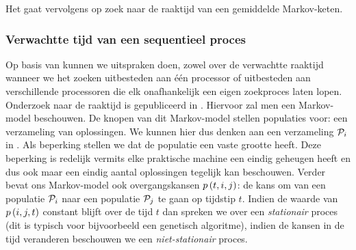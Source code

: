 Het  gaat vervolgens op zoek naar de raaktijd van een gemiddelde Markov-keten.

\subsubsection{Verwachtte tijd van een sequentieel proces}

Op basis van  kunnen we uitspraken doen, zowel over de verwachtte raaktijd wanneer we het zoeken uitbesteden aan \'e\'en processor of uitbesteden aan verschillende processoren die elk onafhankelijk een eigen zoekproces laten lopen. Onderzoek naar de raaktijd is gepubliceerd in \cite{DBLP:journals/jc/ShonkwilerV94}. Hiervoor zal men een Markov-model beschouwen. De knopen van dit Markov-model stellen populaties voor: een verzameling van oplossingen. We kunnen hier dus denken aan een verzameling $\mathcal{P}_i$ in . Als beperking stellen we dat de populatie een vaste grootte heeft. Deze beperking is redelijk vermits elke praktische machine een eindig geheugen heeft en dus ook maar een eindig aantal oplossingen tegelijk kan beschouwen. Verder bevat ons Markov-model ook overgangskansen $p\left(t,i,j\right)$: de kans om van een populatie $\mathcal{P}_i$ naar een populatie $\mathcal{P}_j$ te gaan op tijdstip $t$. Indien de waarde van $p\left(i,j,t\right)$ constant blijft over de tijd $t$ dan spreken we over een \emph{stationair} proces (dit is typisch voor bijvoorbeeld een genetisch algoritme), indien de kansen in de tijd veranderen beschouwen we een \emph{niet-stationair} proces.

\paragraph{}

